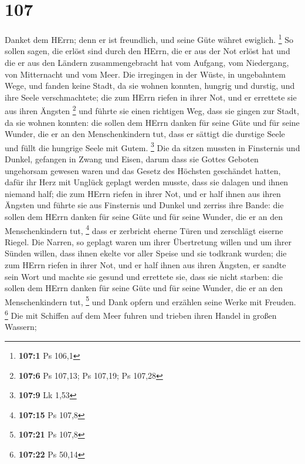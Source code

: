 \hypertarget{section-34}{%
\section{107}\label{section-34}}

 Danket dem HErrn; denn er ist freundlich, und seine Güte
währet ewiglich. \footnote{\textbf{107:1} Ps 106,1}  So
sollen sagen, die erlöst sind durch den HErrn, die er aus der Not erlöst
hat  und die er aus den Ländern zusammengebracht hat vom
Aufgang, vom Niedergang, von Mitternacht und vom Meer.  Die
irregingen in der Wüste, in ungebahntem Wege, und fanden keine Stadt, da
sie wohnen konnten,  hungrig und durstig, und ihre Seele
verschmachtete;  die zum HErrn riefen in ihrer Not, und er
errettete sie aus ihren Ängsten \footnote{\textbf{107:6} Ps 107,13; Ps
  107,19; Ps 107,28}  und führte sie einen richtigen Weg,
dass sie gingen zur Stadt, da sie wohnen konnten:  die
sollen dem HErrn danken für seine Güte und für seine Wunder, die er an
den Menschenkindern tut,  dass er sättigt die durstige Seele
und füllt die hungrige Seele mit Gutem. \footnote{\textbf{107:9} Lk 1,53}
 Die da sitzen mussten in Finsternis und Dunkel, gefangen
in Zwang und Eisen,  darum dass sie Gottes Geboten
ungehorsam gewesen waren und das Gesetz des Höchsten geschändet hatten,
 dafür ihr Herz mit Unglück geplagt werden musste, dass sie
dalagen und ihnen niemand half;  die zum HErrn riefen in
ihrer Not, und er half ihnen aus ihren Ängsten  und führte
sie aus Finsternis und Dunkel und zerriss ihre Bande:  die
sollen dem HErrn danken für seine Güte und für seine Wunder, die er an
den Menschenkindern tut, \footnote{\textbf{107:15} Ps 107,8}
 dass er zerbricht eherne Türen und zerschlägt eiserne
Riegel.  Die Narren, so geplagt waren um ihrer Übertretung
willen und um ihrer Sünden willen,  dass ihnen ekelte vor
aller Speise und sie todkrank wurden;  die zum HErrn riefen
in ihrer Not, und er half ihnen aus ihren Ängsten,  er
sandte sein Wort und machte sie gesund und errettete sie, dass sie nicht
starben:  die sollen dem HErrn danken für seine Güte und
für seine Wunder, die er an den Menschenkindern tut, \footnote{\textbf{107:21}
  Ps 107,8}  und Dank opfern und erzählen seine Werke mit
Freuden. \footnote{\textbf{107:22} Ps 50,14}  Die mit
Schiffen auf dem Meer fuhren und trieben ihren Handel in großen Wassern;
